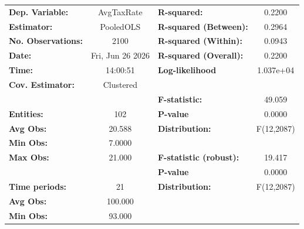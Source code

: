 \begin{center}
\begin{tabular}{lclc}
\toprule
\textbf{Dep. Variable:}                            &     AvgTaxRate     & \textbf{  R-squared:         }   &      0.2200      \\
\textbf{Estimator:}                                &     PooledOLS      & \textbf{  R-squared (Between):}  &      0.2964      \\
\textbf{No. Observations:}                         &        2100        & \textbf{  R-squared (Within):}   &      0.0943      \\
\textbf{Date:}                                     &  Fri, Jun 26 2026  & \textbf{  R-squared (Overall):}  &      0.2200      \\
\textbf{Time:}                                     &      14:00:51      & \textbf{  Log-likelihood     }   &    1.037e+04     \\
\textbf{Cov. Estimator:}                           &     Clustered      & \textbf{                     }   &                  \\
\textbf{}                                          &                    & \textbf{  F-statistic:       }   &      49.059      \\
\textbf{Entities:}                                 &        102         & \textbf{  P-value            }   &      0.0000      \\
\textbf{Avg Obs:}                                  &       20.588       & \textbf{  Distribution:      }   &    F(12,2087)    \\
\textbf{Min Obs:}                                  &       7.0000       & \textbf{                     }   &                  \\
\textbf{Max Obs:}                                  &       21.000       & \textbf{  F-statistic (robust):} &      19.417      \\
\textbf{}                                          &                    & \textbf{  P-value            }   &      0.0000      \\
\textbf{Time periods:}                             &         21         & \textbf{  Distribution:      }   &    F(12,2087)    \\
\textbf{Avg Obs:}                                  &      100.000       & \textbf{                     }   &                  \\
\textbf{Min Obs:}                                  &       93.000       & \textbf{                     }   &                  \\

\end{tabular}
\end{center}
